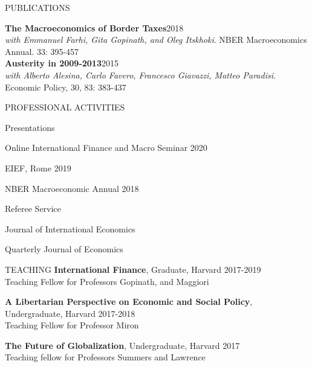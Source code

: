 \documentclass{resume} %
\begin{document}
\begin{rSection}{PUBLICATIONS}
	
	{\textbf{The Macroeconomics of Border Taxes}\hfill{2018}}\\\textit{with Emmanuel Farhi, Gita Gopinath, and Oleg Itskhoki}. NBER Macroeconomics Annual. 33: 395-457\\

	
	\textbf{Austerity in 2009-2013}\hfill 2015\\
	\textit{with Alberto Alesina, Carlo Favero, Francesco Giavazzi, Matteo Paradisi.} Economic Policy, 30, 83: 383-437\\

	
\end{rSection} 






\begin{rSection}{PROFESSIONAL ACTIVITIES} 
\begin{rSubsection}{Presentations}{}{}{}
	\item Online International Finance and Macro Seminar \hfill 2020
	\item EIEF, Rome \hfill 2019
	\item NBER Macroeconomic Annual \hfill 2018
\end{rSubsection}

\begin{rSubsection}{Referee Service}{}{}{}
	\item Journal of International Economics
	\item Quarterly Journal of Economics
\end{rSubsection}

\end{rSection} 

\begin{rSection}{TEACHING} 
\textbf{International Finance}, Graduate, Harvard \hfill 2017-2019 \\
Teaching Fellow for Professors Gopinath, and Maggiori

\textbf{A Libertarian Perspective on Economic and Social Policy}, Undergraduate, Harvard \hfill 2017-2018 \\ Teaching Fellow for Professor Miron

\textbf{The Future of Globalization}, Undergraduate, Harvard \hfill 2017 \\
Teaching fellow for Professors Summers and Lawrence
\end{rSection}

\smallskip 
\end{document}
